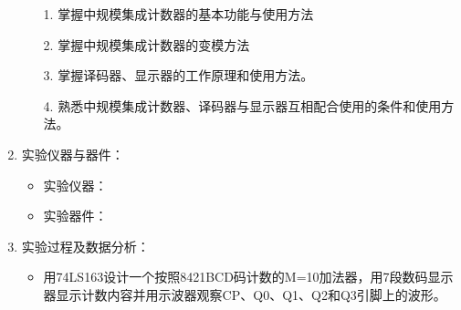 \documentclass[UTF8]{ctexart}
\begin{document}
\begin{enumerate}
          \begin{itemize}
              \item [1.]  掌握中规模集成计数器的基本功能与使用方法
              \item [2.]  掌握中规模集成计数器的变模方法
              \item [3.]  掌握译码器、显示器的工作原理和使用方法。
              \item [4.] 熟悉中规模集成计数器、译码器与显示器互相配合使用的条件和使用方法。
          \end{itemize}
    \item  实验仪器与器件：
          \begin{itemize}
              \item 实验仪器：\\
              \item 实验器件：\\
          \end{itemize}

    \item  实验过程及数据分析：  \\
          \begin{itemize}
              \item 用74LS163设计一个按照8421BCD码计数的M=10加法器，用7段数码显示器显示计数内容并用示波器观察CP、Q0、Q1、Q2和Q3引脚上的波形。\\
          \end{itemize}
\end{enumerate}
\end{document}
